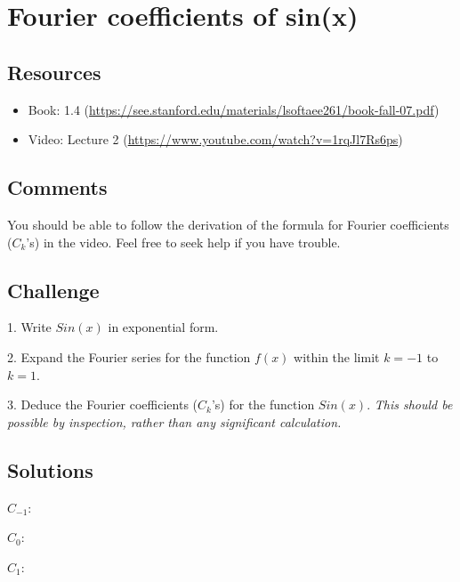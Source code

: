 \newpage

\section{Fourier coefficients of sin(x)}
\label{sec:fcsinx}

\subsection*{Resources}
\begin{itemize}
    \item Book: 1.4 (\url{https://see.stanford.edu/materials/lsoftaee261/book-fall-07.pdf})
    \item Video: Lecture 2 (\url{https://www.youtube.com/watch?v=1rqJl7Rs6ps})
\end{itemize}

\subsection*{Comments}
You should be able to follow the derivation of the formula for Fourier coefficients ($C_k$'s) in the video. Feel free to seek help if you have trouble.

\subsection*{Challenge}
1. Write $Sin(x)$ in exponential form.

2. Expand the Fourier series for the function $f(x)$ within the limit $k=-1$ to $k=1$. %

3. Deduce the Fourier coefficients ($C_k$'s) for the function $Sin(x)$. \emph{This should be possible by inspection, rather than any significant calculation.} %

\subsection*{Solutions}
$C_{-1}$: 

$C_{0}$: 

$C_{1}$: 

\timebox




\newpage

